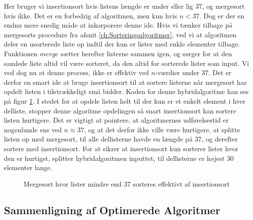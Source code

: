 Her bruger vi insertionsort hvis listens længde er under eller lig $37$, og mergesort hvis ikke. Det er en forbedrig af algoritmen, men kun hvis $n < 37$. Dog er der en endnu mere snedig måde at inkorporere denne ide. Hvis vi tænker tilbage på mergesorts procedure fra afsnit \ref{ch:Sorteringsalgoritmer}, ved vi at algoritmen deler en usorterede liste op indtil der kun er lister med enkle elementer tilbage. Funktionen $merge$ sætter herefter listerne sammen igen, og sørger for at den samlede liste altid vil være sorteret, da den altid for sorterede lister som input. Vi ved dog nu at denne process, ikke er effektiv ved $n$-værdier under 37. Det er derfor en smart ide at bruge insertionsort til at sortere listerne når mergesort har opdelt listen i tilstrækkeligt små bidder. Koden for denne hybridalgoritme kan ses på figur \ref{fig:hybridalgoritme i Python}. I stedet for at opdele listen helt til der kun er et enkelt element i hver delliste, stopper denne algoritme opdelingen så snart insertionsort kan sortere listen hurtigere. Det er vigtigt at pointere, at algoritmernes udførelsestid er nogenlunde ens ved $n \approx 37$, og at det derfor ikke ville være hurtigere, at splitte listen op med mergesort, til alle dellisterne havde en længde på $37$, og derefter sortere med insertionsort. For at sikrer at insertionsort kun sorterer lister hvor den er hurtigst, splitter hybridalgoritmen inputtet, til dellisterne er højest $30$ elementer lange.


\begin{figure}
	\begin{center}
		
	\end{center}
	\caption{Mergesort hvor lister mindre end 37 sorteres effektivt af insertionsort}
	\label{fig:hybridalgoritme i Python}
\end{figure}







\subsection{Sammenligning af Optimerede Algoritmer}%
\label{sub:Sammenligning af Optimerede Algoritmer}



